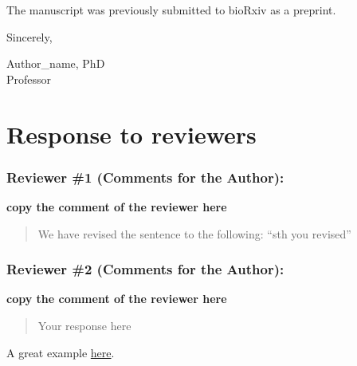 \documentclass[review]{elsarticle} %
\begin{document}
The manuscript was previously submitted to bioRxiv as a preprint.

Sincerely,

Author\_name, PhD\\
Professor

\section*{Response to reviewers}\label{response-to-reviewers}

\subsubsection*{Reviewer \#1 (Comments for the
Author):}\label{reviewer-1-comments-for-the-author}

\textbf{copy the comment of the reviewer here}

\begin{quote}
We have revised the sentence to the following: ``sth you revised''
\end{quote}

\subsubsection*{Reviewer \#2 (Comments for the
Author):}\label{reviewer-2-comments-for-the-author}

\textbf{copy the comment of the reviewer here}

\begin{quote}
Your response here
\end{quote}

A great example
\href{https://github.com/SchlossLab/Tomkovich_PEG3350_mSphere_2021/blob/master/submission/response_to_reviewers.md}{here}.
\end{document}
